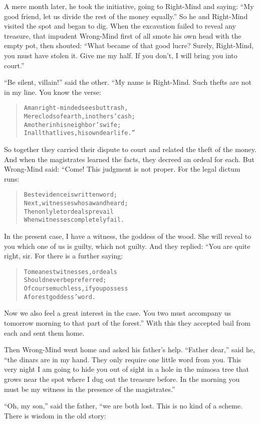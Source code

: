 \documentclass[article, twoside, 14pt]{memoir}
\renewenvironment{verbatim}{%
\begin{quote}%
\vskip -10pt%
\begin{alltt}\normalfont\large}{\end{alltt}%
\end{quote}%
\vskip -10pt
} %
\begin{document}
A mere month later, he took the initiative, going to Right-Mind and
saying:
``My good friend, let us divide the rest of the money equally.'' So
he and Right-Mind visited the spot and began to dig. When the
excavation failed to reveal any treasure, that impudent Wrong-Mind
first of all smote his own head with the empty pot, then shouted:
``What became of that good lucre? Surely, Right-Mind, you must have stolen it. Give me my half. If you don't, I will bring you into court.''

``Be silent, villain!'' said the other. “My name is Right-Mind.
Such thefts are not in my line. You know the verse:

\begin{verbatim}
A man right-minded sees but trash,
Mere clods of earth, in others' cash;
A mother in his neighbor's wife;
In all that lives, his own dear life.”
\end{verbatim}
So together they carried their dispute to court and related the
theft of the money. And when the magistrates learned the facts,
they decreed an ordeal for each. But Wrong-Mind said: “Come! This
judgment is not proper. For the legal dictum runs:

\begin{verbatim}
Best evidence is written word;
Next, witnesses who saw and heard;
Then only let ordeals prevail
When witnesses completely fail.
\end{verbatim}
In the present case, I have a witness, the goddess of the wood. She
will reveal to you which one of us is guilty, which not
guilty. And they replied: “You are quite right, sir. For there is a
further saying:

\begin{verbatim}
To meanest witnesses, ordeals
    Should never be preferred;
Of course much less, if you possess
    A forest goddess' word.
\end{verbatim}
Now we also feel a great interest in the case. You two must
accompany us tomorrow morning to that part of the forest.” With
this they accepted bail from each and sent them home.

Then Wrong-Mind went home and asked his father's help.
``Father dear,'' said he,
``the dinars are in my hand. They only require one little word from you. This very night I am going to hide you out of sight in a hole in the mimosa tree that grows near the spot where I dug out the treasure before. In the morning you must be my witness in the presence of the magistrates.''

``Oh, my son,'' said the father, “we are both lost. This is no kind
of a scheme. There is wisdom in the old story:
\end{document}

